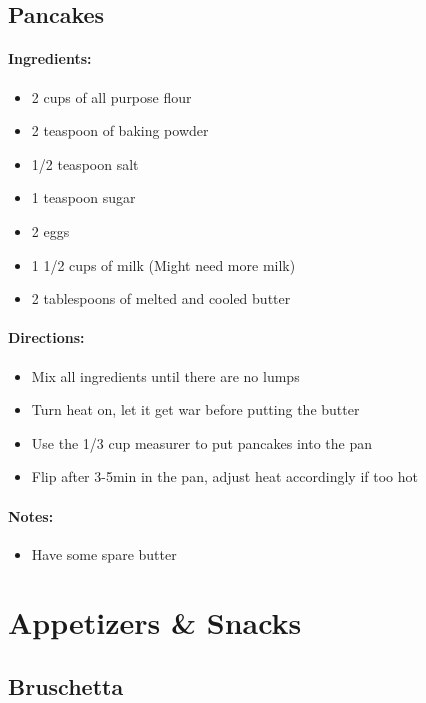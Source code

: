 \documentclass{article}
\begin{document}
\subsection{Pancakes}

\paragraph{Ingredients:}
\begin{itemize}
    \item 2 cups of all purpose flour
    \item 2 teaspoon of baking powder
    \item 1/2 teaspoon salt
    \item 1 teaspoon sugar
    \item 2 eggs
    \item 1 1/2 cups of milk (Might need more milk)
    \item 2 tablespoons of melted and cooled butter
\end{itemize}

\paragraph{Directions:}
\begin{itemize}
    \item Mix all ingredients until there are no lumps
    \item Turn heat on, let it get war before putting the butter
    \item Use the 1/3 cup measurer to put pancakes into the pan
    \item Flip after 3-5min in the pan, adjust heat accordingly if too hot
\end{itemize}

\paragraph{Notes:}
\begin{itemize}
    \item Have some spare butter
\end{itemize}

\section{Appetizers \& Snacks}


\subsection{Bruschetta}
\end{document}
